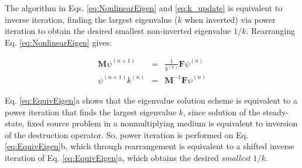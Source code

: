 The algorithm in Eqs. \eqref{eq:NonlinearEigen} and \eqref{eq:k_update} is equivalent to inverse iteration, finding the largest eigenvalue (\(k\) when inverted) via power iteration to obtain the desired smallest non-inverted eigenvalue \(1/k\). Rearranging Eq. \eqref{eq:NonlinearEigen} gives:

\begin{subequations}
\label{eq:EquivEigen}
\begin{eqnarray}
\textbf{M}\psi^{(n+1)}&=&\frac{1}{k^{(n)}}\textbf{F}\psi^{(n)}\\
\psi^{(n+1)}k^{(n)}&=&\textbf{M}^{-1}\textbf{F}\psi^{(n)}
\end{eqnarray}
\end{subequations}

Eq. \eqref{eq:EquivEigen}a shows that the eigenvalue solution scheme is equivalent to a power iteration that finds the largest eigenvalue \(k\), since solution of the steady-state, fixed source problem in a nonmultiplying medium is equivalent to inversion of the destruction operator. So, power iteration is performed on Eq. \eqref{eq:EquivEigen}b, which through rearrangement is equivalent to a shifted inverse iteration of Eq. \eqref{eq:EquivEigen}a, which obtains the desired {\it smallest} \(1/k\).

